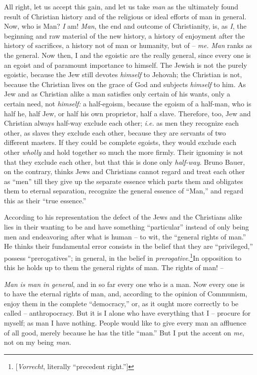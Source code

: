 \documentclass[12pt,a4paper]{book}
\begin{document}
All right, let us accept this gain, and let us take \textit{man} as the 
ultimately found result of Christian history and of the religious or ideal 
efforts of man in general. Now, who is Man? \textit{I} am! \textit{Man}, the 
end and outcome of Christianity, is, as \textit{I}, the beginning and raw 
material of the new history, a history of enjoyment after the history of 
sacrifices, a history not of man or humanity, but of -- \textit{me. Man} ranks 
as the general. Now then, I and the egoistic are the really general, since 
every one is an egoist and of paramount importance to himself. The Jewish is 
not the purely egoistic, because the Jew still devotes \textit{himself} to 
Jehovah; the Christian is not, because the Christian lives on the grace of God 
and subjects \textit{himself} to him. As Jew and as Christian alike a man 
satisfies only certain of his wants, only a certain need, not 
\textit{himself:} a half-egoism, because the egoism of a half-man, who is half 
he, half Jew, or half his own proprietor, half a slave. Therefore, too, Jew 
and Christian always half-way exclude each other; \textit{i.e.} as men they 
recognize each other, as slaves they exclude each other, because they are 
servants of two different masters. If they could be complete egoists, they 
would exclude each other \textit{wholly} and hold together so much the more 
firmly. Their ignominy is not that they exclude each other, but that this is 
done only \textit{half-way}. Bruno Bauer, on the contrary, thinks Jews and 
Christians cannot regard and treat each other as ``men'' till they give up 
the separate essence which parts them and obligates them to eternal 
separation, recognize the general essence of ``Man,'' and regard this as 
their ``true essence.''

According to his representation the defect of the Jews and the Christians 
alike lies in their wanting to be and have something ``particular'' instead 
of only being men and endeavoring after what is human -- to wit, the 
``general rights of man.'' He thinks their fundamental error consists in the 
belief that they are ``privileged,'' possess ``prerogatives''; in general, 
in the belief in \textit{prerogative}.\footnote{[\textit{Vorrecht}, literally 
``precedent right.''] }In opposition to this he holds up to them the general 
rights of man. The rights of man! --

\textit{Man is man in general}, and in so far every one who is a man. Now 
every one is to have the eternal rights of man, and, according to the opinion 
of Communism, enjoy them in the complete ``democracy,'' or, as it ought more 
correctly to be called -- anthropocracy. But it is I alone who have everything 
that I -- procure for myself; as man I have nothing. People would like to give 
every man an affluence of all good, merely because he has the title ``man.'' 
But I put the accent on \textit{me}, not on my being \textit{man}.
\end{document}
